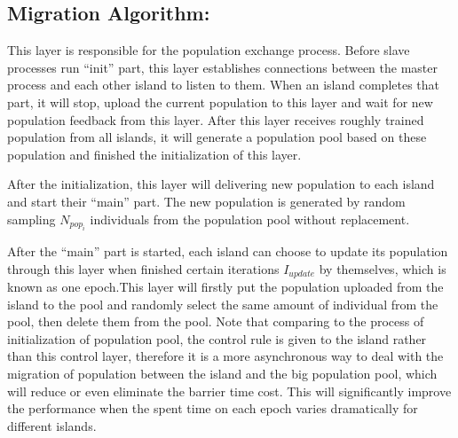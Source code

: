 \documentclass[conference]{IEEEtran}
\begin{document}
	\subsection{Migration Algorithm:}
	This layer is responsible for the population exchange process. Before slave processes run “init” part, this layer establishes connections between the master process and each other island to listen to them. When an island completes that part, it will stop, upload the current population to this layer and wait for new population feedback from this layer. After this layer receives roughly trained population from all islands, it will generate a population pool based on these population and finished the initialization of this layer.
	
	
	After the initialization, this layer will delivering new population to each island and start their “main” part. The new population is generated by random sampling $ N_{pop_i}$ individuals from the population pool without replacement.
	
	
	After the “main” part is started, each island can choose to update its population through this layer when finished certain iterations $I_{update}$ by themselves, which is known as one epoch.This layer will firstly put the population uploaded from the island to the pool and randomly select the same amount of individual from the pool, then delete them from the pool. Note that comparing to the process of initialization of population pool, the control rule is given to the island rather than this control layer, therefore it is a more asynchronous way to deal with the migration of population between the island and the big population pool, which will reduce or even eliminate the barrier time cost. This will significantly improve the performance when the spent time on each epoch varies dramatically for different islands.
  
  
\end{document}
